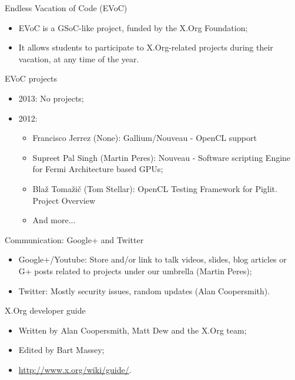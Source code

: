 \documentclass{beamer}
\begin{document}
		\begin{frame}
			\begin{block}{Endless Vacation of Code (EVoC)}
				\begin{itemize}
					\item EVoC is a GSoC-like project, funded by the X.Org Foundation;
					\item It allows students to participate to
X.Org-related projects during their vacation, at any time of the year.
				\end{itemize}
			\end{block}

			\begin{block}{EVoC projects}
				\begin{itemize}
					\item 2013: No projects;
					\item 2012:
					\begin{itemize}
						\item Francisco Jerrez (None): Gallium/Nouveau - OpenCL support
						\item Supreet Pal Singh (Martin Peres): Nouveau - Software scripting Engine for Fermi Architecture based GPUs;
						\item Blaž Tomažič (Tom Stellar): OpenCL Testing Framework for Piglit. Project Overview 
						\item And more...
					\end{itemize}
				\end{itemize}
			\end{block}
		\end{frame}

		\begin{frame}
			\begin{block}{Communication: Google+ and Twitter}
				\begin{itemize}
					\item Google+/Youtube: Store and/or link
to talk videos, slides, blog articles or G+ posts related to projects under our umbrella (Martin Peres);
					\item Twitter: Mostly security issues, random updates (Alan Coopersmith).
				\end{itemize}
			\end{block}

			\begin{block}{X.Org developer guide}
				\begin{itemize}
					\item Written by Alan Coopersmith, Matt Dew and the X.Org team;
					\item Edited by Bart Massey;
					\item \url{http://www.x.org/wiki/guide/}.
				\end{itemize}
			\end{block}
		\end{frame}
\end{document}
